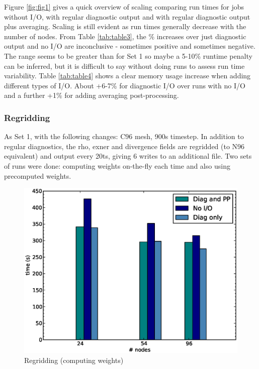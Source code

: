 Figure \ref{fig:fig1} gives a quick overview of scaling comparing run times for jobs without I/O, with regular diagnostic output and with
regular diagnostic output plus averaging. Scaling is still evident as run times generally decrease with the number of nodes. From
Table \ref{tab:table3}, the \% increases over just diagnostic output and no I/O are inconclusive - sometimes positive and sometimes negative. 
The range seems to be greater than for Set 1 so maybe a 5-10\% runtime penalty can be inferred, but it is difficult to say 
without doing runs to assess run time variability. Table \ref{tab:table4} shows a clear memory usage increase when adding different types of I/O. 
About +6-7\% for diagnostic I/O over runs with no I/O and a further +1\% for adding averaging post-processing. 


\subsubsection{Regridding}

As Set 1, with the following changes: C96 mesh, 900s timestep.
In addition to regular diagnostics, the rho, exner and divergence fields are regridded (to N96 equivalent) and output every 20ts, giving 6 writes to an additional file. Two sets of runs were done: computing weights on-the-fly each time and also using precomputed weights.

\normalsize
\begin{figure}[ht!]
  \begin{center}
   \includegraphics[scale=0.4]{figs/regrid.eps}
   \caption{Regridding (computing weights)}
   \label{fig:fig2}
  \end{center}
\end{figure}


